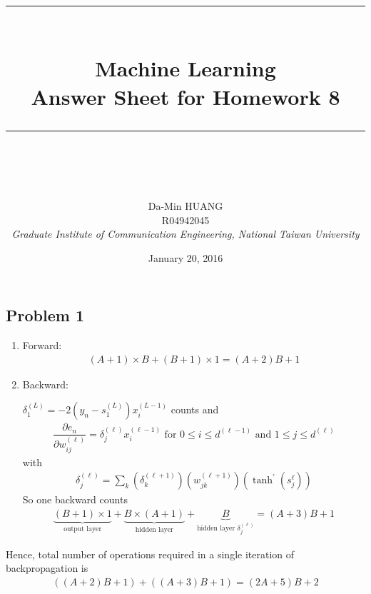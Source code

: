 \documentclass[12pt]{article}
\newcommand{\ParTh}[1]{\left(#1\right)}
\newcommand{\horrule}[1]{\rule{\linewidth}{#1}}
\begin{document}
\baselineskip 6.5mm
\setlength{\parindent}{0pt}
\title{ 
\normalfont \normalsize 
\horrule{0.5pt} \\[0.4cm]
\huge { \Huge Machine Learning \\ \large Answer Sheet for Homework 8}\\
\horrule{2pt} \\ [0.5cm]
}
\author{ { \Large Da-Min HUANG } \\
{\small R04942045} \\
{\small\textit{Graduate Institute of Communication Engineering, National Taiwan University}}
}
\date{January 20, 2016}
\maketitle

\subsection*{Problem 1}

\begin{enumerate}
	\item Forward:
	\begin{align}
	\ParTh{A+1}\times B+\ParTh{B+1}\times1=\ParTh{A+2}B+1
	\end{align}
	\item Backward:
	
	$\delta^{\ParTh{L}}_1=-2\ParTh{y_n-s^{\ParTh{L}}_1}x^{\ParTh{L-1}}_i$ counts and
	\begin{align}
	\dfrac{\partial e_n}{\partial w^{\ParTh{\ell}}_{ij}}=\delta^{\ParTh{\ell}}_jx^{\ParTh{\ell-1}}_i\text{ for }0\leq i\leq d^{\ParTh{\ell-1}}\text{ and }1\leq j\leq d^{\ParTh{\ell}}
	\end{align}
	with
	\begin{align}
	\delta^{\ParTh{\ell}}_j=\sum_{k}\ParTh{\delta^{\ParTh{\ell+1}}_k}\ParTh{w^{\ParTh{\ell+1}}_{jk}}\ParTh{\tanh^\prime\ParTh{s^{\ell}_j}}
	\end{align}
	So one backward counts
	\begin{align}
	\underbrace{\ParTh{B+1}\times1}_{\text{output layer}}+\underbrace{B\times\ParTh{A+1}}_{\text{hidden layer}}+\underbrace{B}_{\text{hidden layer }\delta^{\ParTh{\ell}}_j}=\ParTh{A+3}B+1
	\end{align}
\end{enumerate}
Hence, total number of operations required in a single iteration of backpropagation is
\begin{align}
\ParTh{\ParTh{A+2}B+1}+\ParTh{\ParTh{A+3}B+1}=\ParTh{2A+5}B+2
\end{align}
\end{document}
